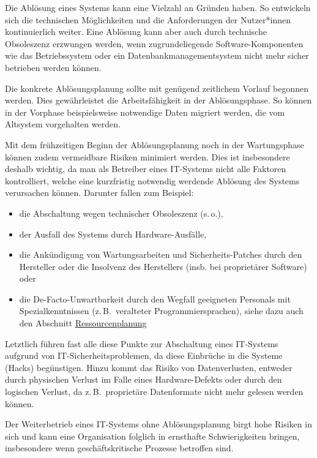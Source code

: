 \documentclass[
  11pt,
  letterpaper,
  DIV=11,
  twoside]{scrreprt}
\begin{document}
Die Ablösung eines Systems kann eine Vielzahl an Gründen haben. So
entwickeln sich die technischen Möglichkeiten und die Anforderungen der
Nutzer*innen kontinuierlich weiter. Eine Ablösung kann aber auch durch
technische Obsoleszenz erzwungen werden, wenn zugrundeliegende
Software-Komponenten wie das Betriebssystem oder ein
Datenbankmanagementsystem nicht mehr sicher betrieben werden können.

Die konkrete Ablösungsplanung sollte mit genügend zeitlichem Vorlauf
begonnen werden. Dies gewährleistet die Arbeitsfähigkeit in der
Ablösungsphase. So können in der Vorphase beispielsweise notwendige
Daten migriert werden, die vom Altsystem vorgehalten werden.

Mit dem frühzeitigen Beginn der Ablösungsplanung noch in der
Wartungsphase können zudem vermeidbare Risiken minimiert werden. Dies
ist insbesondere deshalb wichtig, da man als Betreiber eines IT-Systems
nicht alle Faktoren kontrolliert, welche eine kurzfristig notwendig
werdende Ablösung des Systems verursachen können. Darunter fallen zum
Beispiel:

\begin{itemize}
\item
  die Abschaltung wegen technischer Obsoleszenz (s.\,o.),
\item
  der Ausfall des Systems durch Hardware-Ausfälle,
\item
  die Ankündigung von Wartungsarbeiten und Sicherheits-Patches durch den
  Hersteller oder die Insolvenz des Herstellers (insb. bei proprietärer
  Software) oder
\item
  die De-Facto-Unwartbarkeit durch den Wegfall geeigneten Personals mit
  Spezialkenntnissen (z.\,B.~veralteter Programmiersprachen), siehe dazu
  auch den Abschnitt \hyperref[ressourcenplanung]{Ressourcenplanung}
\end{itemize}

Letztlich führen fast alle diese Punkte zur Abschaltung eines IT-Systems
aufgrund von IT-Sicherheitsproblemen, da diese Einbrüche in die Systeme
(Hacks) begünstigen. Hinzu kommt das Risiko von Datenverlusten, entweder
durch physischen Verlust im Falle eines Hardware-Defekts oder durch den
logischen Verlust, da z.\,B.~proprietäre Datenformate nicht mehr gelesen
werden können.

Der Weiterbetrieb eines IT-Systems ohne Ablösungsplanung birgt hohe
Risiken in sich und kann eine Organisation folglich in ernsthafte
Schwierigkeiten bringen, insbesondere wenn geschäftskritische Prozesse
betroffen sind.
\end{document}
